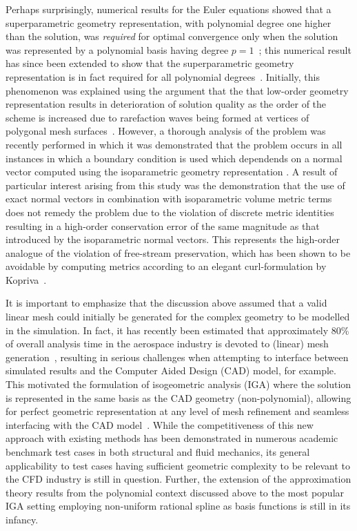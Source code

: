 Perhaps surprisingly, numerical results for the Euler equations showed that a
superparametric geometry representation, with polynomial degree one higher than
the solution, was \emph{required} for optimal convergence only when the solution
was represented by a polynomial basis having degree $p = 1$~\cite{Bassi1997};
this numerical result has since been extended to show that the superparametric
geometry representation is in fact required for all polynomial
degrees~\cite{Zwanenburg2017}.
Initially, this phenomenon was explained using the argument that the
that low-order geometry representation results in deterioration of
solution quality as the order of the scheme is increased due to rarefaction
waves being formed at vertices of polygonal mesh
surfaces~\cite{Krivodonova2006}. However, a thorough analysis of the problem was
recently performed in which it was demonstrated that the problem occurs in all
instances in which a boundary condition is used which dependends on a normal
vector computed using the isoparametric geometry representation . A result of particular interest
arising from this study was the demonstration that the use of exact normal
vectors in combination with isoparametric volume metric terms does not remedy
the problem due to the violation of discrete metric identities resulting in a
high-order conservation error of the same magnitude as that introduced by the
isoparametric normal vectors. This represents the high-order analogue
of the violation of free-stream preservation, which has been shown to be
avoidable by computing metrics according to an elegant curl-formulation by
Kopriva~\cite{Kopriva2006}.

It is important to emphasize that the discussion above assumed that a valid linear
mesh could initially be generated for the complex geometry to be modelled in the
simulation. In fact, it has recently been estimated that approximately 80\% of
overall analysis time in the aerospace industry is devoted to (linear) mesh
generation~\cite{Hughes2005}, resulting in serious challenges when attempting to
interface between simulated results and the
Computer Aided Design (CAD) model, for example. This motivated the formulation
of isogeometric analysis (IGA) where the solution is represented in the same basis as
the CAD geometry (non-polynomial), allowing for perfect geometric representation at any level of
mesh refinement and seamless interfacing with the CAD model~\cite{Hughes2005}.
While the competitiveness of this new approach with existing methods has been
demonstrated in numerous academic benchmark test cases in both structural and fluid
mechanics, its general applicability to test cases having sufficient geometric
complexity to be relevant to the CFD industry is still in question. Further, the
extension of the approximation theory results from the polynomial context discussed
above to the most popular IGA setting employing non-uniform rational spline as
basis functions is still in its infancy.